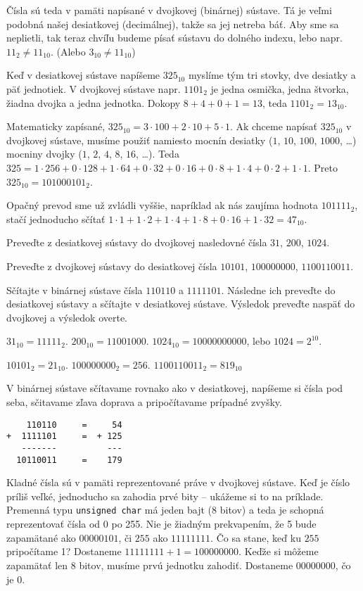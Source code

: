 \medskip
Čísla sú teda v pamäti napísané v dvojkovej (binárnej) sústave. Tá je veľmi
podobná našej desiatkovej (decimálnej), takže sa jej netreba báť.  Aby sme sa
neplietli, tak teraz chvíľu budeme písať sústavu do dolného indexu, lebo napr.
$11_2 \neq 11_{10}$. (Alebo $3_{10} \neq 11_{10}$)

Keď v desiatkovej sústave napíšeme $325_{10}$ myslíme tým tri stovky, dve
desiatky a päť jednotiek. V dvojkovej sústave napr. $1101_2$ je jedna osmička,
jedna štvorka, žiadna dvojka a jedna jednotka. Dokopy $8+4+0+1 = 13$, teda
$1101_2 = 13_{10}$. 

Matematicky zapísané, $325_{10} = 3\cdot 100 + 2\cdot 10 + 5\cdot 1$. Ak chceme
napísať $325_{10}$ v dvojkovej sústave, musíme použiť namiesto mocnín desiatky
($1$, $10$, $100$, $1000$, \dots) mocniny dvojky ($1$, $2$, $4$, $8$, $16$,
\dots). Teda $325 = 1\cdot 256 + 0\cdot 128 + 1\cdot 64 + 0\cdot 32 + 0\cdot 16
+ 0\cdot 8 + 1\cdot 4 + 0\cdot 2 + 1\cdot 1$.  Preto $325_{10} = 101000101_2$.

Opačný prevod sme už zvládli vyššie, napríklad ak nás zaujíma hodnota
$101111_2$, stačí jednoducho sčítať $1\cdot 1 + 1\cdot 2 + 1\cdot 4 + 1\cdot 8
+ 0\cdot 16 + 1\cdot 32 = 47_{10}$.

\cvicenie Preveďte z desiatkovej sústavy do dvojkovej nasledovné čísla $31$, $200$,
$1024$.

\cvicenie Preveďte z dvojkovej sústavy do desiatkovej čísla $10101$,
$100000000$, $1100110011$.

\cvicenie Sčítajte v binárnej sústave čísla $110110$ a $1111101$. Následne
ich preveďte do desiatkovej sústavy a sčítajte v desiatkovej sústave. Výsledok
preveďte naspäť do dvojkovej a výsledok overte.

\riesenie $31_{10} = 11111_2$. $200_{10} = 11001000$. $1024_{10} =
10000000000$, lebo $1024 = 2^{10}$.

\riesenie $10101_2 = 21_{10}$. $100000000_2 = 256$. $1100110011_2 =
819_{10}$

\riesenie V binárnej sústave sčítavame rovnako ako v desiatkovej, napíšeme si
čísla pod seba, sčitavame zľava doprava a pripočítavame prípadné zvyšky.
\begin{verbatim}
    110110     =     54
+  1111101     =  + 125
   -------          ---
  10110011     =    179
\end{verbatim}

\medskip

Kladné čísla sú v pamäti reprezentované práve v dvojkovej sústave. Keď je číslo
príliš veľké, jednoducho sa zahodia prvé bity -- ukážeme si to na príklade.
Premenná typu \verb!unsigned char! má jeden bajt (8 bitov) a teda je schopná
reprezentovať čísla od 0 po 255. Nie je žiadným prekvapením, že 5 bude
zapamätané ako $00000101$, či $255$ ako $11111111$. Čo sa stane, keď ku $255$
pripočítame 1? Dostaneme $11111111 + 1 = 100000000$.  Keďže si môžeme zapamätať
len 8 bitov, musíme prvú jednotku zahodiť. Dostaneme $00000000$, čo je 0.

